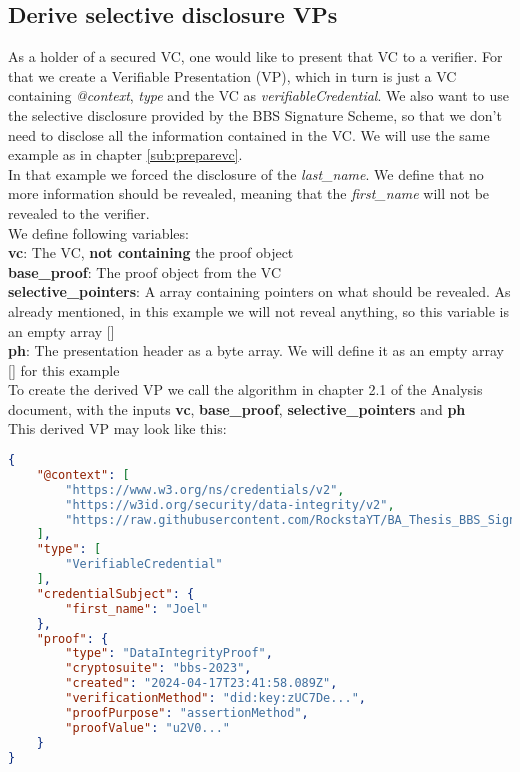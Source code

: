 \documentclass[
	a4paper               %
	,bibliography=totoc   %
	,listof=totoc         %
	,monolingual
]{bfhthesis}              %
\begin{document}
\subsection{Derive selective disclosure VPs}
As a holder of a secured VC, one would like to present that VC to a verifier.
For that we create a Verifiable Presentation (VP), which in turn is just a VC containing \textit{@context}, \textit{type} and the VC as \textit{verifiableCredential}.
We also want to use the selective disclosure provided by the BBS Signature Scheme, so that we don't need to disclose all the information contained in the VC.
We will use the same example as in chapter \ref{sub:preparevc}.\\
In that example we forced the disclosure of the \textit{last\_name}. We define that no more information should be revealed, meaning that the \textit{first\_name} will not be revealed to the verifier.\\

We define following variables:\\
\textbf{vc}: The VC, \textbf{not containing} the proof object\\
\textbf{base\_proof}: The proof object from the VC\\
\textbf{selective\_pointers}: A array containing pointers on what should be revealed. As already mentioned, in this example we will not reveal anything, so this variable is an empty array []\\
\textbf{ph}: The presentation header as a byte array. We will define it as an empty array [] for this example\\

To create the derived VP we call the algorithm in chapter 2.1 of the Analysis document, with the inputs \textbf{vc}, \textbf{base\_proof}, \textbf{selective\_pointers} and \textbf{ph}\\

This derived VP may look like this:
\begin{lstlisting}[language=json,firstnumber=1,caption={Derived VP},captionpos=b]
{
	"@context": [
		"https://www.w3.org/ns/credentials/v2",
		"https://w3id.org/security/data-integrity/v2",
		"https://raw.githubusercontent.com/RockstaYT/BA_Thesis_BBS_Signatures/docs/context/example_1.jsonld"
	],
	"type": [
		"VerifiableCredential"
	],
	"credentialSubject": {
		"first_name": "Joel"
	},
	"proof": {
		"type": "DataIntegrityProof",
		"cryptosuite": "bbs-2023",
		"created": "2024-04-17T23:41:58.089Z",
		"verificationMethod": "did:key:zUC7De...",
		"proofPurpose": "assertionMethod",
		"proofValue": "u2V0..."
	}
}
\end{lstlisting}
\end{document}
